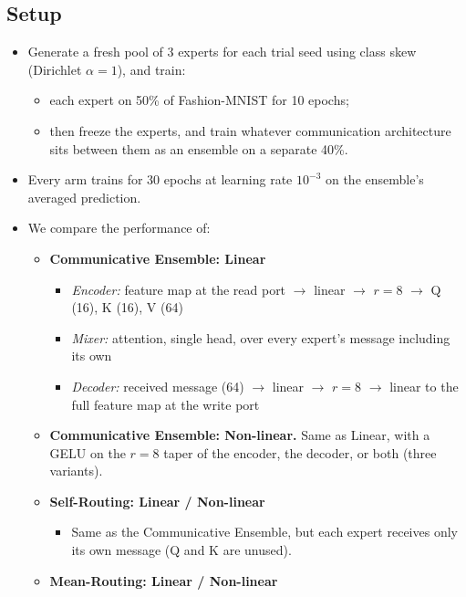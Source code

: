 \documentclass[11pt,a4paper]{article}
\newcommand{\ra}{$\rightarrow$}
\begin{document}
\subsection{Setup}

\begin{itemize}
  \item Generate a fresh pool of 3 experts for each trial seed using class skew
        (Dirichlet $\alpha = 1$), and train:
    \begin{itemize}
      \item each expert on 50\% of Fashion-MNIST for 10 epochs;
      \item then freeze the experts, and train whatever communication architecture sits between
            them as an ensemble on a separate 40\%.
    \end{itemize}
  \item Every arm trains for 30 epochs at learning rate $10^{-3}$ on the ensemble's averaged
        prediction.
  \item We compare the performance of:
    \begin{itemize}
      \item \textbf{Communicative Ensemble: Linear}
        \begin{itemize}
          \item \emph{Encoder:} feature map at the read port \ra{} linear \ra{} $r = 8$ \ra{}
                Q (16), K (16), V (64)
          \item \emph{Mixer:} attention, single head, over every expert's message including its own
          \item \emph{Decoder:} received message (64) \ra{} linear \ra{} $r = 8$ \ra{} linear to
                the full feature map at the write port
        \end{itemize}
      \item \textbf{Communicative Ensemble: Non-linear.} Same as Linear, with a GELU on the
            $r = 8$ taper of the encoder, the decoder, or both (three variants).
      \item \textbf{Self-Routing: Linear / Non-linear}
        \begin{itemize}
          \item Same as the Communicative Ensemble, but each expert receives only its own message
                (Q and K are unused).
        \end{itemize}
      \item \textbf{Mean-Routing: Linear / Non-linear}
        \begin{itemize}

\end{itemize}
\end{itemize}
\end{itemize}
\end{document}
